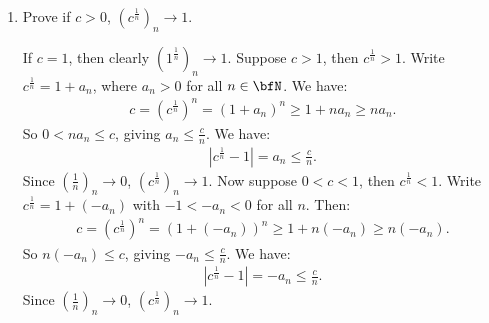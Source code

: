     \begin{example}
        \phantom{a}
        \begin{enumerate}[label = (\arabic*)]
            \item Prove if $c > 0$, $(c^\frac{1}{n})_n \rightarrow 1$.
                \begin{solution}
                    If $c=1$, then clearly $(1^\frac{1}{n})_n \rightarrow 1$. Suppose $c > 1$, then $c^\frac{1}{n} > 1$. Write $c^\frac{1}{n} = 1 + a_n$, where $a_n > 0$ for all $n \in \bfN$. We have:
                        \begin{equation*}
                        \begin{split}
                            c = (c^\frac{1}{n})^n = (1+a_n)^n \geq 1 + n a_n \geq na_n.
                        \end{split}
                        \end{equation*}
                    So $0 < na_n \leq c$, giving $a_n \leq \frac{c}{n}$. We have:
                        \begin{equation*}
                        \begin{split}
                            |c^\frac{1}{n} - 1| = a_n \leq \frac{c}{n}.
                        \end{split}
                        \end{equation*}
                    Since $\left(\frac{1}{n}\right)_n \rightarrow 0$, $(c^\frac{1}{n})_n \rightarrow 1$. Now suppose $0<c<1$, then $c^\frac{1}{n} < 1$. Write $c^\frac{1}{n} = 1 + (-a_n)$ with $-1 < -a_n < 0$ for all $n$. Then:
                        \begin{equation*}
                        \begin{split}
                            c = (c^\frac{1}{n})^n = (1 + (-a_n))^n \geq 1 + n(-a_n) \geq n (-a_n).
                        \end{split}
                        \end{equation*}
                    So $n(-a_n) \leq c$, giving $-a_n \leq \frac{c}{n}$. We have:
                        \begin{equation*}
                        \begin{split}
                            |c^\frac{1}{n} - 1| = -a_n \leq \frac{c}{n}.
                        \end{split}
                        \end{equation*}
                    Since $\left(\frac{1}{n}\right)_n \rightarrow 0$, $(c^\frac{1}{n})_n \rightarrow 1$.
                \end{solution}


\end{enumerate}
\end{example}
